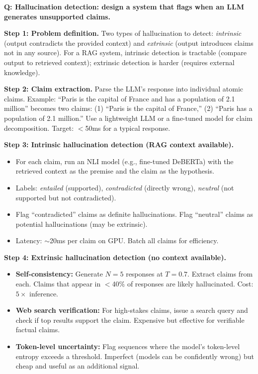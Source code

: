 
\begin{interviewq}
\textbf{Q: Hallucination detection: design a system that flags when an LLM generates unsupported claims.}

 \quad {} \quad \badgefreq{\freqmed}

\stronganswer

\textbf{Step 1: Problem definition.} Two types of hallucination to detect: \textit{intrinsic} (output contradicts the provided context) and \textit{extrinsic} (output introduces claims not in any source). For a RAG system, intrinsic detection is tractable (compare output to retrieved context); extrinsic detection is harder (requires external knowledge).

\textbf{Step 2: Claim extraction.} Parse the LLM's response into individual atomic claims. Example: ``Paris is the capital of France and has a population of 2.1 million'' becomes two claims: (1) ``Paris is the capital of France,'' (2) ``Paris has a population of 2.1 million.'' Use a lightweight LLM or a fine-tuned model for claim decomposition. Target: $<$50ms for a typical response.

\textbf{Step 3: Intrinsic hallucination detection (RAG context available).}
\begin{itemize}
    \item For each claim, run an NLI model (e.g., fine-tuned DeBERTa) with the retrieved context as the premise and the claim as the hypothesis.
    \item Labels: \textit{entailed} (supported), \textit{contradicted} (directly wrong), \textit{neutral} (not supported but not contradicted).
    \item Flag ``contradicted'' claims as definite hallucinations. Flag ``neutral'' claims as potential hallucinations (may be extrinsic).
    \item Latency: $\sim$20ms per claim on GPU. Batch all claims for efficiency.
\end{itemize}

\textbf{Step 4: Extrinsic hallucination detection (no context available).}
\begin{itemize}
    \item \textbf{Self-consistency:} Generate $N = 5$ responses at $T = 0.7$. Extract claims from each. Claims that appear in $<$40\% of responses are likely hallucinated. Cost: $5\times$ inference.
    \item \textbf{Web search verification:} For high-stakes claims, issue a search query and check if top results support the claim. Expensive but effective for verifiable factual claims.
    \item \textbf{Token-level uncertainty:} Flag sequences where the model's token-level entropy exceeds a threshold. Imperfect (models can be confidently wrong) but cheap and useful as an additional signal.
\end{itemize}


\end{interviewq}
